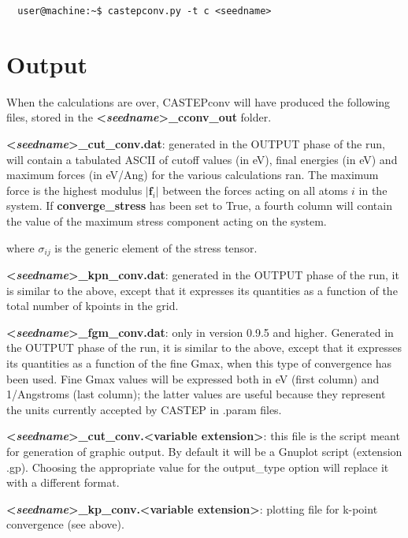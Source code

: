 \documentclass[10pt]{article}
\begin{document}
\begin{lstlisting}
  user@machine:~$ castepconv.py -t c <seedname>
\end{lstlisting}

\section{Output}

When the calculations are over, CASTEPconv will have produced the following 
files, stored in the \textbf{\textless \textit{seedname}\textgreater\_cconv\_out}
folder.

\textbf{\textless \textit{seedname}\textgreater\_cut\_conv.dat}: generated in 
the OUTPUT phase of the run, will contain a tabulated ASCII of cutoff values (in 
eV), final energies (in eV) and maximum forces (in eV/Ang) for the various 
calculations ran. The maximum force is the highest modulus $|\mathbf{f}_i|$ 
between the forces acting on all atoms $i$ in the system. If 
\textbf{converge\_stress} has been set to True, a fourth column will contain the 
value of the maximum stress component acting on the system.

where $\sigma_{ij}$ is the generic element of the stress tensor.

\textbf{\textless \textit{seedname}\textgreater\_kpn\_conv.dat}: generated in 
the OUTPUT phase of the run, it is similar to the above, except that it 
expresses its quantities as a function of the total number of kpoints in the 
grid.

\textbf{\textless \textit{seedname}\textgreater\_fgm\_conv.dat}: only in version 0.9.5 and higher. Generated in 
the OUTPUT phase of the run, it is similar to the above, except that it 
expresses its quantities as a function of the fine Gmax, when this type of convergence has been used. Fine Gmax
values will be expressed both in eV (first column) and 1/Angstroms (last column); the latter values are useful
because they represent the units currently accepted by CASTEP in .param files.

\textbf{\textless \textit{seedname}\textgreater\_cut\_conv.\textless variable extension\textgreater}: this file is the script meant for generation of graphic 
output. By default it will be a Gnuplot script (extension .gp). Choosing the
appropriate value for the output\_type option will replace it with a different format.

\textbf{\textless \textit{seedname}\textgreater\_kp\_conv.\textless variable extension\textgreater}: plotting file for k-point convergence (see above).
\end{document}
